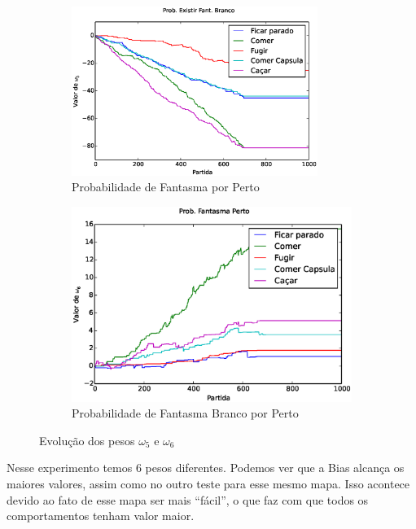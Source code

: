 \begin{figure}[H]
	\centering
	\begin{subfigure}[t]{.5\textwidth}
		\centering
		\includegraphics[width=80mm]{images/5_behaviors_original_map/weights____pol__ProbExistirFantBranco}
		\caption{Probabilidade de Fantasma por Perto}
		\label{img:5ComportamentosMapaOriginal:PesoProbFantasmaPorPerto}
	\end{subfigure}%
	\begin{subfigure}[t]{.5\textwidth}
		\centering
		\includegraphics[width=\linewidth]{images/5_behaviors_original_map/weights____pol__ProbFantasmaPerto}
		\caption{Probabilidade de Fantasma Branco por Perto}
	\label{img:5ComportamentosMapaOriginal:PesoProbFantasmaBrancoPorPerto}
	\end{subfigure}
	\caption{Evolução dos pesos $ \omega_5 $ e $ \omega_6 $}
	\label{img:5ComportamentosMapaOriginal:PesoProbFantasmaBrancoExistirOuNormalPerto}
\end{figure}

Nesse experimento temos 6 pesos diferentes. Podemos ver que a Bias alcança os maiores valores, assim como no outro teste para esse mesmo mapa. Isso acontece devido ao fato de esse mapa ser mais ``fácil'', o que faz com que todos os comportamentos tenham valor maior.

